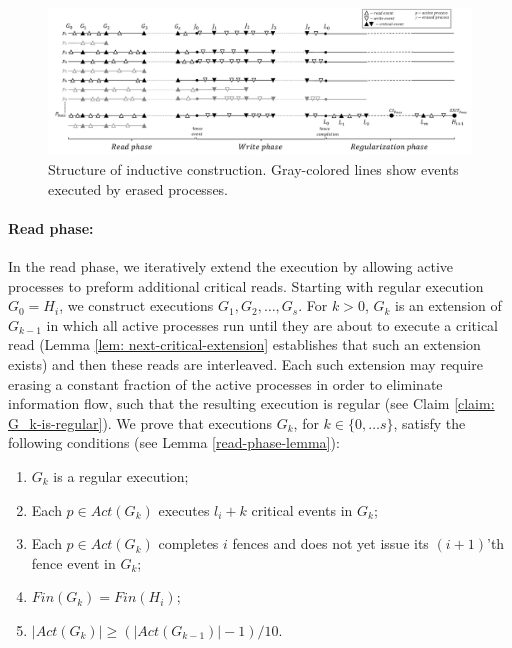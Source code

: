 \begin{figure}
\begin{center}
\includegraphics[scale=0.55]{ConstructionScheme3.pdf}
\end{center}
\vspace{-6pt}
\caption{\small Structure of inductive construction. Gray-colored lines show events executed by erased processes.}
\label{figure:ConstructionScheme}
\end{figure}

\paragraph{Read phase:}
In the read phase, we iteratively extend the execution by allowing active processes to preform additional critical reads. Starting with regular execution $G_0=H_i$, we construct executions $G_1,G_2,\ldots,G_s$. For $k>0$, $G_k$ is an extension of $G_{k-1}$ in which all active processes run until they are about to execute a critical read (Lemma \ref{lem: next-critical-extension} establishes that such an extension exists) and then these reads are interleaved. Each such extension may require erasing a constant fraction of the active processes in order to eliminate information flow, such that the resulting execution is regular (see Claim \ref{claim: G_k-is-regular}). We prove that executions $G_k$, for $k \in \{0, \ldots s\}$, satisfy the following conditions (see Lemma \ref{read-phase-lemma}):
 \begin{enumerate}[(1)]
 	\item $G_k$ is a regular execution;
 	\item Each $p \in Act(G_k)$ executes $l_i+k$ critical events in $G_k$;
 	\item Each $p \in Act(G_k)$ completes $i$ fences and does not yet issue its $(i+1)$'th fence event in $G_k$;
 	\item $Fin(G_k) = Fin(H_i)$;
 	\item $|Act(G_k)| \geq (|Act(G_{k-1})|-1)/10$.
 \end{enumerate}


